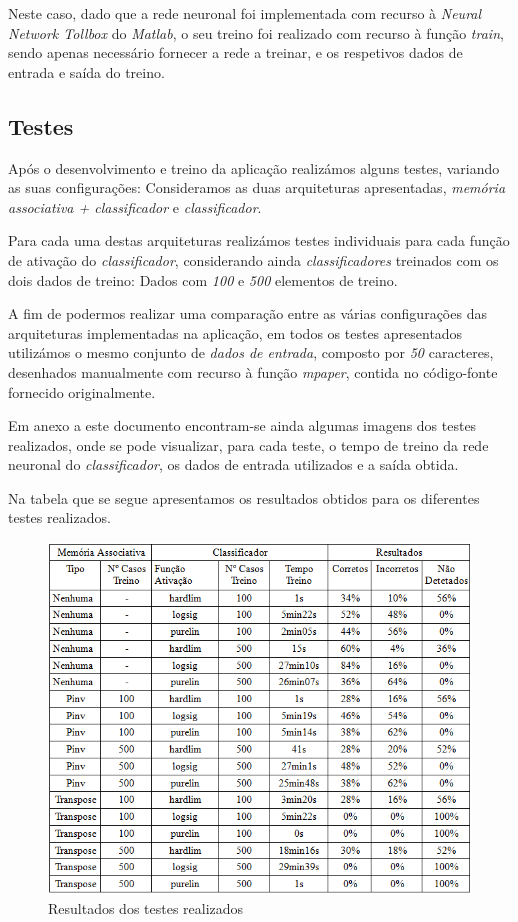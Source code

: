 \documentclass{article}
\begin{document}
Neste caso, dado que a rede neuronal foi implementada com recurso à \emph{Neural Network Tollbox} do \emph{Matlab}, o seu treino foi realizado com recurso à função \emph{train}, sendo apenas necessário fornecer a rede a treinar, e os respetivos dados de entrada e saída do treino.

\subsection{Testes}

Após o desenvolvimento e treino da aplicação realizámos alguns testes, variando as suas configurações: Consideramos as duas arquiteturas apresentadas,  \emph{memória associativa + classificador} e \emph{classificador}.

Para cada uma destas arquiteturas realizámos testes individuais para cada função de ativação do \emph{classificador}, considerando ainda \emph{classificadores} treinados com os dois dados de treino: Dados com \emph{100} e \emph{500} elementos de treino.

A fim de podermos realizar uma comparação entre as várias configurações das arquiteturas implementadas na aplicação, em todos os testes apresentados utilizámos o mesmo conjunto de \emph{dados de entrada}, composto por \emph{50} caracteres, desenhados manualmente com recurso à função \emph{mpaper}, contida no código-fonte fornecido originalmente.

Em anexo a este documento encontram-se ainda algumas imagens dos testes realizados, onde se pode visualizar, para cada teste, o tempo de treino da rede neuronal do \emph{classificador}, os dados de entrada utilizados e a saída obtida.

Na tabela que se segue apresentamos os resultados obtidos para os diferentes testes realizados.

\begin{figure}[h]
  \centering
      \includegraphics[scale=0.7]{Results.png}
  \caption{Resultados dos testes realizados}
\end{figure}
\end{document}
